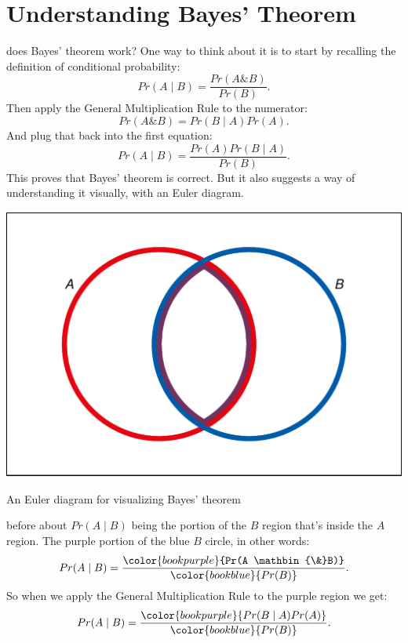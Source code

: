 \documentclass[justified]{tufte-book}
\newcommand{\given}{\mid}
\renewcommand{\wedge}{\mathbin{\&}}
\newcommand{\p}{Pr}
\theoremstyle{definition}
\theoremstyle{definition}
\theoremstyle{definition}
\theoremstyle{remark}
\begin{document}
\hypertarget{understanding-bayes-theorem}{%
\section{Understanding Bayes' Theorem}\label{understanding-bayes-theorem}}

 does Bayes' theorem work? One way to think about it is to start by recalling the definition of conditional probability:
\[ \p(A \given B) = \frac{\p(A \wedge B)}{\p(B)}. \]
Then apply the General Multiplication Rule to the numerator:
\[ \p(A \wedge B) = \p(B \given A)\p(A).\]
And plug that back into the first equation:
\[ \p(A \given B) = \frac{\p(A) \p(B \given A)}{\p(B)}. \]
This proves that Bayes' theorem is correct. But it also suggests a way of understanding it visually, with an Euler diagram.

\begin{marginfigure}
\includegraphics{_main_files/figure-latex/unnamed-chunk-80-1} \caption[An Euler diagram for visualizing Bayes' theorem]{An Euler diagram for visualizing Bayes' theorem}\label{fig:unnamed-chunk-80}
\end{marginfigure}

 before about \(\p(A \given B)\) being the portion of the \(B\) region that's inside the \(A\) region. The purple portion of the blue \(B\) circle, in other words:
\[
  \begin{aligned}
    \p(A \given B) &= \frac{ \color{bookpurple}{\p(A \wedge B)} }{ \color{bookblue}{\p(B)} }.\\
  \end{aligned}
\]
So when we apply the General Multiplication Rule to the purple region we get:
\[
  \begin{aligned}
    \p(A \given B) &= \frac{ \color{bookpurple}{\p(B \given A)\p(A)} }{ \color{bookblue}{\p(B)} }.\\
  \end{aligned}
\]
\end{document}
